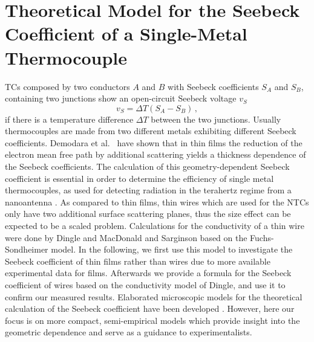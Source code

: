 \documentclass[journal]{IEEEtran}
\begin{document}
\section{Theoretical Model for the Seebeck Coefficient of a Single-Metal Thermocouple}
\label{SeebeckTheory}
%
TCs composed by two
conductors $A$ and $B$ with Seebeck coefficients $S_{A}$ and $S_{B}$,
containing two junctions show an open-circuit Seebeck voltage $v_{S}$
\begin{equation}\label{SVoltage}
v_{S}=\Delta T(S_{A}-S_{B})\,,
\end{equation}
if there is a temperature difference $\Delta T$ between the two junctions.
Usually thermocouples are made from two different metals exhibiting different
Seebeck coefficients. Demodara et al.~\cite{damodara_size_1987} have shown that in thin films the
reduction of the electron mean free path by additional scattering yields a
thickness dependence of the Seebeck coefficients.
The calculation of this geometry-dependent Seebeck coefficient is essential in
order to determine the efficiency of single metal thermocouples, as used for
detecting radiation in the terahertz regime from a nanoantenna
\cite{szakmany_antenna_2013}. As compared to thin films, thin wires which are used for the NTCs only have two
additional surface scattering planes, thus the size effect can be expected to be a scaled problem. Calculations for the conductivity of a thin wire were done by Dingle \cite{dingle1950electrical} and MacDonald and Sarginson
\cite{macdonald1950size} based on the Fuchs-Sondheimer model. In the
following, we first use this model to investigate the Seebeck coefficient  of thin films rather than wires due to more available  experimental data for films. Afterwards we provide a formula for the Seebeck coefficient of wires based on the conductivity model of Dingle, and use it to confirm our measured results. Elaborated microscopic models for the theoretical calculation of the Seebeck coefficient have been developed \cite{ramu2010rigorous,kim2009influence,wang2014ballistic,hicks1993thermoelectric, broido2001theory, cattani2006thermoelectric}. However, here our focus is on more compact, semi-empirical models which provide insight into the geometric dependence and serve as a guidance to experimentalists.
\end{document}
